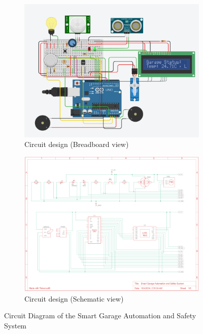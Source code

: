 \documentclass{article}
\begin{document}
\begin{figure}[H]
    \centering
    \begin{subfigure}{0.45\textwidth}
        \centering
        \includegraphics[width=\linewidth]{breadboard_view.png}
        \caption{Circuit design (Breadboard view)}
    \end{subfigure}
    \hfill
    \begin{subfigure}{0.45\textwidth}
        \centering
        \includegraphics[width=\linewidth]{schematic_view.png}
        \caption{Circuit design (Schematic view)}
    \end{subfigure}
    \caption{Circuit Diagram of the Smart Garage Automation and Safety System}
    \label{fig:garage_circuit}
\end{figure}
\end{document}
